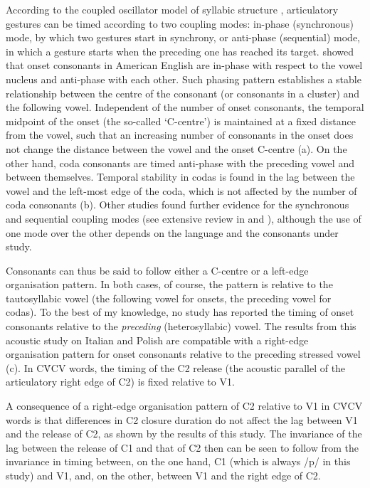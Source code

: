 \documentclass[preprint]{JASAnew}
\begin{document}
According to the coupled oscillator model of syllabic structure
\citep{browman1988, browman2000, goldstein2006, goldstein2014},
articulatory gestures can be timed according to two coupling modes:
in-phase (synchronous) mode, by which two gestures start in synchrony,
or anti-phase (sequential) mode, in which a gesture starts when the
preceding one has reached its target. \citet{marin2010} showed that
onset consonants in American English are in-phase with respect to the
vowel nucleus and anti-phase with each other. Such phasing pattern
establishes a stable relationship between the centre of the consonant
(or consonants in a cluster) and the following vowel. Independent of the
number of onset consonants, the temporal midpoint of the onset (the
so-called `C-centre') is maintained at a fixed distance from the vowel,
such that an increasing number of consonants in the onset does not
change the distance between the vowel and the onset C-centre
(a). On the other hand, coda consonants are timed
anti-phase with the preceding vowel and between themselves. Temporal
stability in codas is found in the lag between the vowel and the
left-most edge of the coda, which is not affected by the number of coda
consonants (b). Other studies found further
evidence for the synchronous and sequential coupling modes (see
extensive review in \citealt{marin2010} and \citealt{marin2014}),
although the use of one mode over the other depends on the language and
the consonants under study.

Consonants can thus be said to follow either a C-centre or a left-edge
organisation pattern. In both cases, of course, the pattern is relative
to the tautosyllabic vowel (the following vowel for onsets, the
preceding vowel for codas). To the best of my knowledge, no study has
reported the timing of onset consonants relative to the \emph{preceding}
(heterosyllabic) vowel. The results from this acoustic study on Italian
and Polish are compatible with a right-edge organisation pattern for
onset consonants relative to the preceding stressed vowel
(c). In CV́CV words, the timing of the C2 release
(the acoustic parallel of the articulatory right edge of C2) is fixed
relative to V1.

A consequence of a right-edge organisation pattern of C2 relative to V1
in CV́CV words is that differences in C2 closure duration do not affect
the lag between V1 and the release of C2, as shown by the results of
this study. The invariance of the lag between the release of C1 and that
of C2 then can be seen to follow from the invariance in timing between,
on the one hand, C1 (which is always /p/ in this study) and V1, and, on
the other, between V1 and the right edge of C2.
\end{document}
